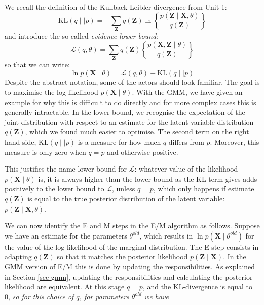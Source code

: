 We recall the definition of the Kullback-Leibler divergence from Unit 1:
$$
\mbox{KL}( q \mid \mid p) = -\sum_{\boldsymbol{Z}} q(\boldsymbol{Z}) \ln \left\{ \frac{p(\boldsymbol{Z} \mid \boldsymbol{X}, \theta)}{q(\boldsymbol{Z})} \right\}
$$
and introduce the so-called \emph{evidence lower bound}:
$$
\mathcal{L}(q, \theta) = \sum_{\boldsymbol{Z}} q(\boldsymbol{Z}) \left\{ \frac{p(\boldsymbol{X},\boldsymbol{Z} \mid \theta) }{q(\boldsymbol{Z})} \right\}
$$
so that we can write:
\begin{equation}
  \ln p(\boldsymbol{X} \mid \theta) = \mathcal{L}(q, \theta) + \mbox{KL}(q\mid\mid p)
  \label{eq-decom}
 \end{equation}
Despite the abstract notation, some of the actors should look familiar. The goal is to maximise the log likelihood $p(\boldsymbol{X} \mid \theta)$. With the
GMM, we have given an example for why this is difficult to do directly and for more complex cases this is generally intractable. In the lower bound, we recognise the
expectation of the joint distribution with respect to an estimate for the latent variable distribution $q( \boldsymbol{Z})$, which we found much easier
to optimise. The second term on the right hand side, $\mbox{KL}(q \mid \mid p)$ is a measure for how much $q$ differs from $p$. Moreover, this measure
is only zero when $q = p$ and otherwise positive.

This justifies the name lower bound for $\mathcal{L}$: whatever value of the likelihood $p(\boldsymbol{X} \mid \theta )$ is, it is always higher than the lower bound as the
KL term gives adds positively to the lower bound to $\mathcal{L}$, unless $q = p$, which only happens if estimate $q(\boldsymbol{Z})$
is equal to the true posterior distribution of the latent variable: $p(\boldsymbol{Z} \mid \boldsymbol{X}, \theta)$.

We can now identify the E and M steps in the E/M algorithm as follows. Suppose we have an estimate for the parameters $\theta^{old}$, which
results in $\ln p(\boldsymbol{X} \mid \theta^{old})$ for the value of the log likelihood of the marginal distribution. The E-step consists in adapting
$q(\boldsymbol{Z})$ so that it matches the posterior likelihood $p(\boldsymbol{Z} \mid \boldsymbol{X})$. In the GMM version of E/M this is done by
updating the responsibilities. As explained in Section \ref{sec-gmm}, updating the responsibilities and calculating the posterior likelihood are equivalent. At this
stage $q=p$, and the KL-divergence is equal to 0, \emph{so for this choice of $q$, for parameters $\theta^{old}$ we have}


